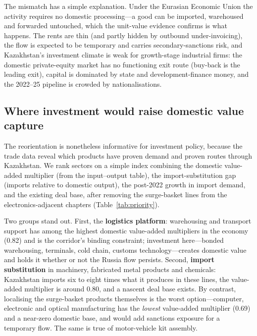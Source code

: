 \documentclass[12pt]{article}
\begin{document}
The mismatch has a simple explanation. Under the Eurasian Economic Union the activity requires
no domestic processing---a good can be imported, warehoused and forwarded untouched, which the
unit-value evidence confirms is what happens. The rents are thin (and partly hidden by
outbound under-invoicing), the flow is expected to be temporary and carries secondary-sanctions
risk, and Kazakhstan's investment climate is weak for growth-stage industrial firms: the
domestic private-equity market has no functioning exit route (buy-back is the leading exit),
capital is dominated by state and development-finance money, and the 2022--25 pipeline is
crowded by nationalisations.

\subsection{Where investment would raise domestic value capture}

The reorientation is nonetheless informative for investment policy, because the trade data
reveal which products have proven demand and proven routes through Kazakhstan. We rank
sectors on a simple index combining the domestic value-added multiplier (from the
input--output table), the import-substitution gap (imports relative to domestic output), the
post-2022 growth in import demand, and the existing deal base, after removing the
surge-basket lines from the electronics-adjacent chapters (Table~\ref{tab:priority}).

Two groups stand out. First, the \textbf{logistics platform}: warehousing and transport
support has among the highest domestic value-added multipliers in the economy (0.82) and is
the corridor's binding constraint; investment here---bonded warehousing, terminals, cold
chain, customs technology---creates domestic value and holds it whether or not the Russia
flow persists. Second, \textbf{import substitution} in machinery, fabricated metal products
and chemicals: Kazakhstan imports six to eight times what it produces in these lines, the
value-added multiplier is around 0.80, and a nascent deal base exists. By contrast, localising
the surge-basket products themselves is the worst option---computer, electronic and optical
manufacturing has the \emph{lowest} value-added multiplier (0.69) and a near-zero domestic
base, and would add sanctions exposure for a temporary flow. The same is true of motor-vehicle
kit assembly.
\end{document}
